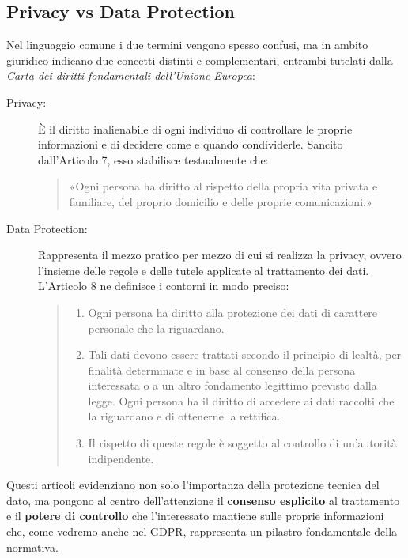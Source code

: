 \subsection*{Privacy vs Data Protection}

Nel linguaggio comune i due termini vengono spesso confusi, ma in ambito giuridico indicano due concetti distinti e complementari, entrambi tutelati dalla \textit{Carta dei diritti fondamentali dell'Unione Europea}:

\begin{description}
    \item[Privacy:] È il diritto inalienabile di ogni individuo di controllare le proprie informazioni e di decidere come e quando condividerle.
    Sancito dall'Articolo 7, esso stabilisce testualmente che:
    \begin{quote}
        «Ogni persona ha diritto al rispetto della propria vita privata e familiare, del proprio domicilio e delle proprie comunicazioni.»
    \end{quote}

    \item[Data Protection:] Rappresenta il mezzo pratico per mezzo di cui si realizza la privacy, ovvero l'insieme delle regole e delle tutele applicate al trattamento dei dati.
    L'Articolo 8 ne definisce i contorni in modo preciso:
    \begin{quote}
        \begin{enumerate}
            \item Ogni persona ha diritto alla protezione dei dati di carattere personale che la riguardano.
            \item Tali dati devono essere trattati secondo il principio di lealtà, per finalità determinate e in base al consenso della persona interessata o a un altro fondamento legittimo previsto dalla legge. Ogni persona ha il diritto di accedere ai dati raccolti che la riguardano e di ottenerne la rettifica.
            \item Il rispetto di queste regole è soggetto al controllo di un'autorità indipendente.           
        \end{enumerate}
    \end{quote}
\end{description}

Questi articoli evidenziano non solo l'importanza della protezione tecnica del dato, ma pongono al centro dell'attenzione il \textbf{consenso esplicito} al trattamento e il \textbf{potere di controllo} che l'interessato mantiene sulle proprie informazioni che, come vedremo anche nel GDPR, rappresenta un pilastro fondamentale della normativa.


